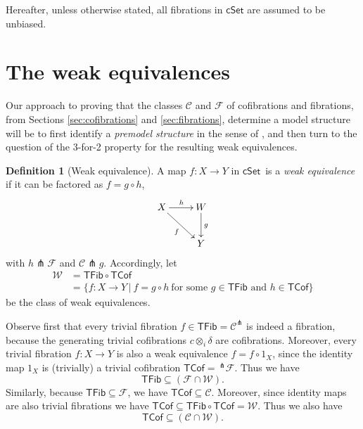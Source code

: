 \documentclass[11pt]{amsart}
\newcommand{\CC}{\ensuremath{\mathcal{C}}}
\newcommand{\WW}{\ensuremath{\mathcal{W}}}
\newcommand{\FF}{\ensuremath{\mathcal{F}}}
\newcommand{\cSet}{\ensuremath{\mathsf{cSet}}}
\newcommand{\mono}{\ensuremath{\rightarrowtail}}
\newcommand{\ra}{\ensuremath{\rightarrow}}
\renewcommand{\to}{\ensuremath{\rightarrow}}
\newcommand{\TFib}{\ensuremath{\mathsf{TFib}}}
\newcommand{\TCof}{\ensuremath{\mathsf{TCof}}}
\newtheorem{corollary}[theorem]{Corollary}
\theoremstyle{remark}
\theoremstyle{definition}
\newtheorem{definition}[theorem]{Definition}
\begin{document}
Hereafter, unless otherwise stated, all fibrations in $\cSet$ are assumed to be  unbiased.

%

\section{The weak equivalences}

Our approach to proving that the classes $\CC$ and $\FF$ of cofibrations and fibrations, from Sections \ref{sec:cofibrations} and \ref{sec:fibrations}, determine a model structure will be to first identify a \emph{premodel structure} in the sense of \cite{Barton}, and then turn to the question of the 3-for-2 property for the resulting weak equivalences.

\begin{definition}[Weak equivalence]
A map $f: X\ra Y$ in \cSet\ is a \emph{weak equivalence} if it can be factored as $f  = g\circ h$,
\begin{equation*}%
\xymatrix{
X \ar[rd]_{f} \ar[r]^h & W\ar[d]^g\\
& Y
}
\end{equation*}
with $h \pitchfork \FF$ and $\CC\pitchfork g$.  Accordingly, let 
\begin{align*}
\mathcal{W} &= \TFib\circ\TCof \\
	&= \{f: X\ra Y\, |\ f = g\circ h\ \text{for some $g\in\mathsf{TFib}$ and $h\in\mathsf{TCof}$} \}
\end{align*}
 be the class of weak equivalences.
\end{definition}

Observe first that every trivial fibration $f\in\TFib = \mathcal{C}^\pitchfork$ is indeed a fibration, because the generating trivial cofibrations $c\otimes_i\delta$ are cofibrations.  Moreover, every trivial fibration $f : X\to Y$ is also a weak equivalence $f = f\circ 1_X$, since the identity map $1_X$ is (trivially) a trivial cofibration $\TCof =\, ^{\pitchfork}\mathcal{F}$. Thus we have
\[
\mathsf{TFib} \subseteq (\mathcal{F} \cap \mathcal{W}).
\]
%
Similarly, because $\TFib\subseteq\FF$, we have $\TCof\subseteq\CC$.  Moreover, since identity maps are also trivial fibrations we have $\TCof\subseteq \TFib\circ\TCof  =\WW$.  Thus we also have
\[
\mathsf{TCof} \subseteq (\mathcal{C} \cap \mathcal{W}).
\]
\end{document}
